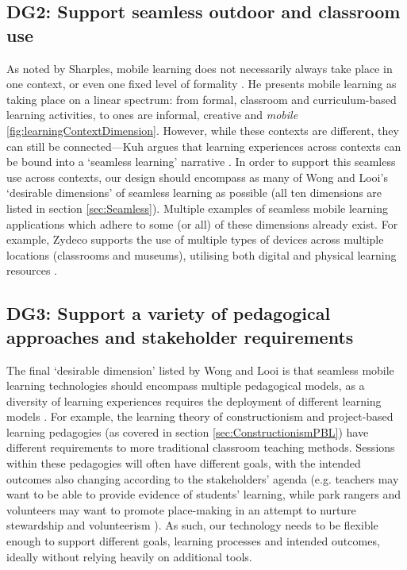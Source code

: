 \subsection*{ DG2: Support seamless outdoor and classroom use }
\label{DG2}

As noted by Sharples, mobile learning does not necessarily always take place in one context, or even one fixed level of formality \citep{Sharples2013}. He presents mobile learning as taking place on a linear spectrum: from formal, classroom and curriculum-based learning activities, to ones are informal, creative and \textit{mobile} \ref{fig:learningContextDimension}. However, while these contexts are different, they can still be connected---Kuh argues that learning experiences across contexts can be bound into a `seamless learning' narrative \citep{Kuh1996}. In order to support this seamless use across contexts, our design should encompass as many of Wong and Looi's `desirable dimensions' of seamless learning as possible \citep{Wong2011} (all ten dimensions are listed in section \ref{sec:Seamless}). Multiple examples of seamless mobile learning applications which adhere to some (or all) of these dimensions already exist. For example, Zydeco supports the use of multiple types of devices across multiple locations (classrooms and museums), utilising both digital and physical learning resources \citep{kuhn2011}.

\subsection*{ DG3: Support a variety of pedagogical approaches and stakeholder requirements }
\label{DG3}

The final `desirable dimension' listed by Wong and Looi is that seamless mobile learning technologies should encompass multiple pedagogical models, as a diversity of learning experiences requires the deployment of different learning models \citep{Wong2011}. For example, the learning theory of constructionism and project-based learning pedagogies (as covered in section \ref{sec:ConstructionismPBL}) have different requirements to more traditional classroom teaching methods. Sessions within these pedagogies will often have different goals, with the intended outcomes also changing according to the stakeholders' agenda (e.g. teachers may want to be able to provide evidence of students' learning, while park rangers and volunteers may want to promote place-making in an attempt to nurture stewardship and volunteerism \citep{Richardson2017}). As such, our technology needs to be flexible enough to support different goals, learning processes and intended outcomes, ideally without relying heavily on additional tools.

